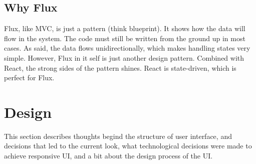 \subsection{Why Flux}
Flux, like MVC, is just a pattern (think blueprint). It shows how the data will flow in the system. The code must still be written from the ground up in most cases. As said, the data flows unidirectionally, which makes handling states very simple. However, Flux in it self is just another design pattern. Combined with React, the strong sides of the pattern shines. React is state-driven, which is perfect for Flux.

\section{Design}
This section describes thoughts begind the structure of user interface, and decisions that led to the current look, what technological decisions were made to achieve responsive UI, and a bit about the design process of the UI.
